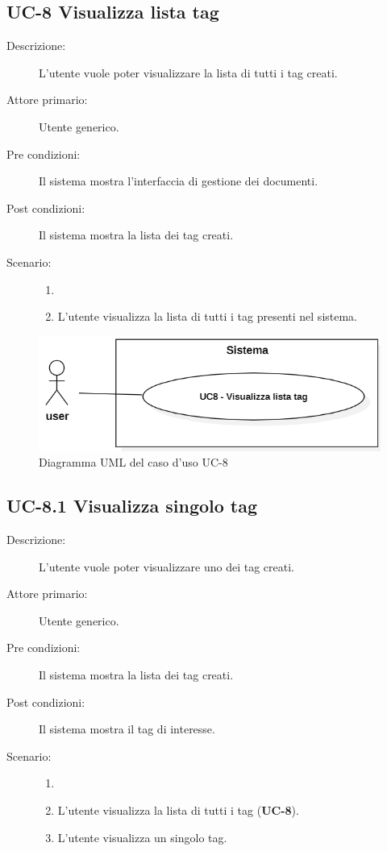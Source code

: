 \subsection{UC-8 Visualizza lista tag}
\begin{description}
    \item[Descrizione:] L’utente vuole poter visualizzare la lista di tutti i tag creati.
    \item[Attore primario:] Utente generico.
    \item[Pre condizioni:] Il sistema mostra l'interfaccia di gestione dei documenti.
    \item[Post condizioni:] Il sistema mostra la lista dei tag creati.
    \item[Scenario:]
    \begin{enumerate}
        \item[]
        \item L’utente visualizza la lista di tutti i tag presenti nel sistema.
    \end{enumerate}
\end{description}
\begin{figure}[H]
    \centering
    \includegraphics[width=0.8\linewidth]{UC8.PNG} %
    \caption{Diagramma UML del caso d'uso UC-8}
    \label{fig:UC8}
\end{figure}

\subsection{UC-8.1 Visualizza singolo tag}
\begin{description}
    \item[Descrizione:] L’utente vuole poter visualizzare uno dei tag creati.
    \item[Attore primario:] Utente generico.
    \item[Pre condizioni:] Il sistema mostra la lista dei tag creati.
    \item[Post condizioni:] Il sistema mostra il tag di interesse.
    \item[Scenario:]
    \begin{enumerate}
        \item[]
        \item L’utente visualizza la lista di tutti i tag (\textbf{UC-8}).
        \item L'utente visualizza un singolo tag.
    \end{enumerate}
\end{description}

